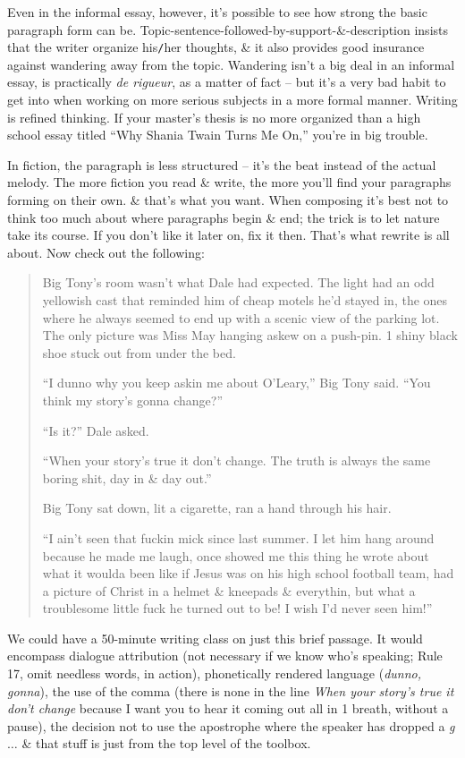 \documentclass{article}
\numberwithin{equation}{section}
\begin{document}
Even in the informal essay, however, it's possible to see how strong the basic paragraph form can be. Topic-sentence-followed-by-support-\&-description insists that the writer organize his{\tt/}her thoughts, \& it also provides good insurance against wandering away from the topic. Wandering isn't a big deal in an informal essay, is practically \textit{de rigueur}, as a matter of fact -- but it's a very bad habit to get into when working on more serious subjects in a more formal manner. Writing is refined thinking. If your master's thesis is no more organized than a high school essay titled ``Why Shania Twain Turns Me On,'' you're in big trouble.

In fiction, the paragraph is less structured -- it's the beat instead of the actual melody. The more fiction you read \& write, the more you'll find your paragraphs forming on their own. \& that's what you want. When composing it's best not to think too much about where paragraphs begin \& end; the trick is to let nature take its course. If you don't like it later on, fix it then. That's what rewrite is all about. Now check out the following:
\begin{quotation}
	Big Tony's room wasn't what Dale had expected. The light had an odd yellowish cast that reminded him of cheap motels he'd stayed in, the ones where he always seemed to end up with a scenic view of the parking lot. The only picture was Miss May hanging askew on a push-pin. 1 shiny black shoe stuck out from under the bed.
	
	``I dunno why you keep askin me about O'Leary,'' Big Tony said. ``You think my story's gonna change?''
	
	``Is it?'' Dale asked.
	
	``When your story's true it don't change. The truth is always the same boring shit, day in \& day out.''
	
	Big Tony sat down, lit a cigarette, ran a hand through his hair.
	
	``I ain't seen that fuckin mick since last summer. I let him hang around because he made me laugh, once showed me this thing he wrote about what it woulda been like if Jesus was on his high school football team, had a picture of Christ in a helmet \& kneepads \& everythin, but what a troublesome little fuck he turned out to be! I wish I'd never seen him!''
\end{quotation}
We could have a 50-minute writing class on just this brief passage. It would encompass dialogue attribution (not necessary if we know who's speaking; Rule 17, omit needless words, in action), phonetically rendered language (\textit{dunno, gonna}), the use of the comma (there is none in the line \textit{When your story's true it don't change} because I want you to hear it coming out all in 1 breath, without a pause), the decision not to use the apostrophe where the speaker has dropped a \textit{g} $\ldots$ \& that stuff is just from the top level of the toolbox.
\end{document}
